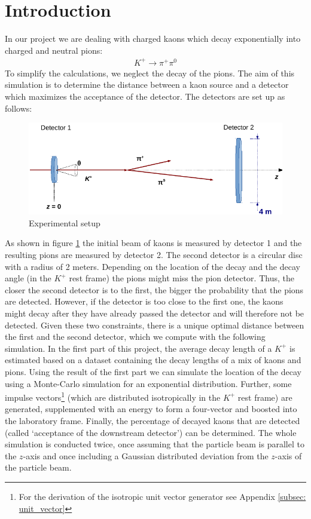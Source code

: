 \documentclass[12pt,a4paper,oneside,english]{article}
\begin{document}
\section{Introduction}
In our project we are dealing with charged kaons which decay exponentially into charged and neutral pions:
\begin{align*}
K^+ \longrightarrow \pi^+ \pi^0
\end{align*}
To simplify the calculations, we neglect the decay of the pions. The aim of this simulation is to determine the distance between a kaon source and a detector which maximizes the acceptance of the detector. The detectors are set up as follows:
\begin{figure}[H]
	\centering
	\includegraphics[]{images/setup.pdf}
	\caption{Experimental setup}
	\label{fig:setup}
\end{figure}
As shown in figure \ref{fig:setup} the initial beam of kaons is measured by detector 1 and the resulting pions are measured by detector 2. The second detector is a circular disc with a radius of 2 meters. Depending on 
the location of the decay and
the decay angle (in the $K^+$ rest frame)
the pions might miss the pion detector. Thus, the closer the second detector is to the first, the bigger the probability that the pions are detected. However, if the detector is too close to the first one, the kaons might decay after they have already passed the detector and will therefore not be detected. Given these two constraints, there is a unique optimal distance between the first and the second detector, which we compute with the following simulation. 
In the first part of this project, the average decay length of a $K^+$ is estimated based on a dataset containing the decay lengths of a mix of kaons and pions. Using the result of the first part we can simulate the location of the decay using a Monte-Carlo simulation for an exponential distribution. Further, some impulse vectors\footnote{For the derivation of the isotropic unit vector generator see Appendix \ref{subsec: unit_vector}} (which are distributed isotropically in the $K^+$ rest frame) are generated, supplemented with an energy to form a four-vector and boosted into the laboratory frame. Finally, the percentage of decayed kaons that are detected (called ‘acceptance of the downstream detector’) can be determined. 
The whole simulation is conducted twice, once assuming that the particle beam is parallel to the $z$-axis and once including a Gaussian distributed deviation from the $z$-axis of the particle beam. 
\end{document}

